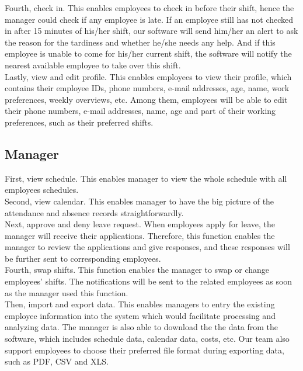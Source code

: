 \documentclass[a4paper,12pt, oneside]{report}
\begin{document}
Fourth, check in. This enables employees to check in before their shift, hence the manager could check if any employee is late. If an employee still has not checked in after 15 minutes of his/her shift, our software will send him/her an alert to ask the reason for the tardiness and whether he/she needs any help. And if this employee is unable to come for his/her current shift, the software will notify the nearest available employee to take over this shift.\\

Lastly, view and edit profile. This enables employees to view their profile, which contains their employee IDs, phone numbers, e-mail addresses, age, name, work preferences, weekly overviews, etc. Among them, employees will be able to edit their phone numbers, e-mail addresses, name, age and part of their working preferences, such as their preferred shifts.\\

\subsection{Manager}
First, view schedule. This enables manager to view the whole schedule with all employees schedules. \\

Second, view calendar. This enables manager to have the big picture of the attendance and absence records straightforwardly.\\

Next, approve and deny leave request. When employees apply for leave, the manager will receive their applications. Therefore, this function enables the manager to review the applications and give responses, and these responses will be further sent to corresponding employees. \\

Fourth, swap shifts. This function enables the manager to swap or change employees’ shifts. The notifications will be sent to the related employees as soon as the manager used this function.\\

Then, import and export data. This enables managers to entry the existing employee information into the system which would facilitate processing and analyzing data. The manager is also able to download the the data from the software, which includes schedule data, calendar data, costs, etc. Our team also support employees to choose their preferred file format during exporting data, such as PDF, CSV and XLS.\\
\end{document}
